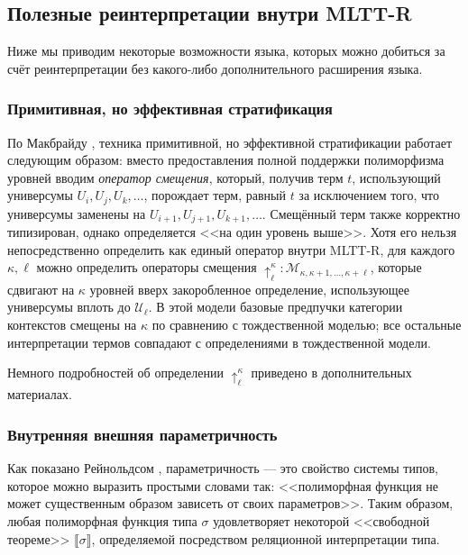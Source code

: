 \subsection{Полезные реинтерпретации внутри MLTT-R}
\label{MLTT-R-applications}

Ниже мы приводим некоторые возможности языка, которых
можно добиться за счёт реинтерпретации без какого-либо
дополнительного расширения языка.

\subsubsection
{Примитивная, но эффективная стратификация}
\label{MLTT-R-displacement}

По Макбрайду
\cite{McBride:Crude2011,McBride:Crude2012}, техника
примитивной, но эффективной стратификации работает
следующим образом: вместо предоставления полной
поддержки полиморфизма уровней вводим \emph{оператор
смещения}, который, получив терм $t$, использующий
универсумы $U_i,U_j,U_k,\ldots$, порождает терм, равный
$t$ за исключением того, что универсумы заменены на
$U_{i+1},U_{j+1},U_{k+1},\ldots$. Смещённый терм также
корректно типизирован, однако определяется <<на один
уровень выше>>. Хотя его нельзя непосредственно
определить как единый оператор внутри MLTT-R, для
каждого $\kappa,\ell$ можно определить операторы
смещения $\uparrow_\ell^\kappa:\mathcal{M}_{\kappa,
\kappa+1,\ldots,\kappa+\ell}$, которые сдвигают на
$\kappa$ уровней вверх закоробленное определение,
использующее универсумы вплоть до $\mathcal{U}_\ell$. В
этой модели базовые предпучки категории контекстов
смещены на $\kappa$ по сравнению с тождественной
моделью; все остальные интерпретации термов совпадают
с определениями в тождественной модели.

Немного подробностей об определении
$\uparrow_\ell^\kappa$ приведено в дополнительных
материалах.

\subsubsection{Внутренняя внешняя параметричность}
\label{MLTT-R-parametricity}

Как показано Рейнольдсом \cite{reynolds1983types},
параметричность — это свойство системы типов, которое
можно выразить простыми словами так: <<полиморфная
функция не может существенным образом зависеть от своих
параметров>>. Таким образом, любая полиморфная функция
типа $\sigma$ удовлетворяет некоторой <<свободной
теореме>> $\llbracket \sigma \rrbracket$, определяемой
посредством реляционной интерпретации типа.

